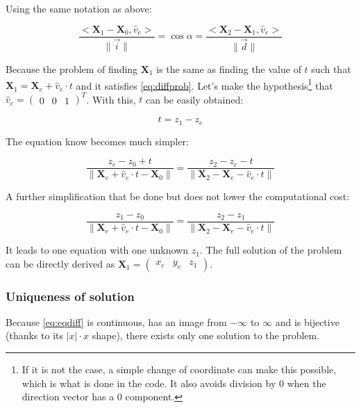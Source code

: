 \documentclass[french,10pt]{article}
\begin{document}
    Using the same notation as above:

    \begin{equation}\label{eq:diffprob}
        \frac{<\pmb{X}_1 - \pmb{X}_0, \hat{v}_e>}{\|\vec{i}\|} = \cos\alpha = \frac{<\pmb{X}_2 - \pmb{X}_1, \hat{v}_e>}{\|\vec{d}\|}
    \end{equation}

    Because the problem of finding $\pmb{X}_1$ is the same as finding the value of $t$ such that $\pmb{X}_1 = \pmb{X}_e + \hat{v}_e \cdot t$ and it satisfies \eqref{eq:diffprob}. Let's make the hypothesis\footnote{If it is not the case, a simple change of coordinate can make this possible, which is what is done in the code. It also avoids division by 0 when the direction vector has a $0$ component.} that $\hat{v}_e = \begin{pmatrix}0 & 0 & 1 \end{pmatrix}
   ^T$. With this, $t$ can be easily obtained:

   \begin{equation}
       t = z_1 - z_e
   \end{equation}

   The equation know becomes much simpler:

   \begin{equation}
       \frac{z_e - z_0 + t}{\|\pmb{X}_e + \hat{v}_e\cdot t - \pmb{X}_0\|} = \frac{z_2 - z_e - t}{\|\pmb{X}_2 - \pmb{X}_e - \hat{v}_e\cdot t\|}
   \end{equation}

   A further simplification that be done but does not lower the computational cost:

   \begin{equation}\label{eq:eqdiff}
       \frac{z_1 - z_0}{\|\pmb{X}_e + \hat{v}_e\cdot t - \pmb{X}_0\|} = \frac{z_2 - z_1}{\|\pmb{X}_2 - \pmb{X}_e - \hat{v}_e\cdot t\|}
   \end{equation}

   It leads to one equation with one unknown $z_1$. The full solution of the problem can be directly derived as $\pmb{X}_1 = \begin{pmatrix}x_e & y_e & z_1 \end{pmatrix}$.

   \subsubsection{Uniqueness of solution}

        Because \eqref{eq:eqdiff} is continuous, has an image from $-\infty$ to $\infty$ and is bijective (thanks to its $|x|\cdot x$ shape), there exists only one solution to the problem.\\
\end{document}
